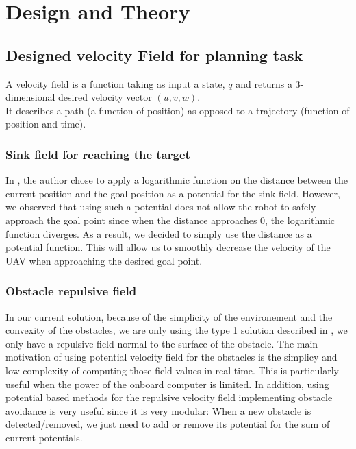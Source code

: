 \section{Design and Theory}
\subsection{Designed velocity Field for planning task}
A velocity field is a function taking as input a state, $q$ and returns a 3-dimensional desired velocity vector $(u,v,w)$.\\ It describes a path (a function of position) as opposed to a trajectory (function of position and time).
\subsubsection{Sink field for reaching the target}
In \cite{mcinnes2003velocity}, the author chose to apply a logarithmic function on the distance between the current position and the goal position as a potential for the sink field. 
However, we observed that using such a potential does not allow the robot to safely approach the goal point since when the distance approaches 0, the logarithmic function diverges.
As a result, we decided to simply use the distance as a potential function. This will allow us to smoothly decrease the velocity of the UAV when approaching the desired goal point.
\subsubsection{Obstacle repulsive field}
In our current solution, because of the simplicity of the environement and the convexity of the obstacles, we are only using the type 1 solution described in \cite{mcinnes2003velocity}, we only have a repulsive field normal to the surface of the obstacle.
The main motivation of using potential velocity field for the obstacles is the simplicy and low complexity of computing those field values in real time. This is particularly useful when the power of the onboard computer is limited. 
In addition, using potential based methods for the repulsive velocity field implementing obstacle avoidance is very useful since it is very modular: When a new obstacle is detected/removed, we just need to add or remove its potential for the sum of current potentials.
